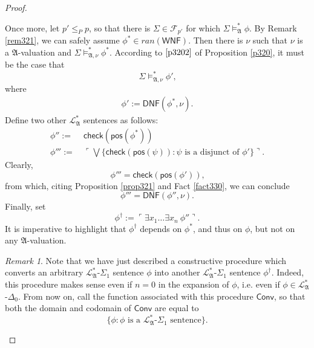 \documentclass[12pt, twoside]{memoir}
\numberwithin{equation}{section}
\theoremstyle{definition}
\theoremstyle{remark}
\newtheorem{rem}[thm]{Remark}
\theoremstyle{definition}
\theoremstyle{definition}
\theoremstyle{definition}
\theoremstyle{remark}
\begin{document}
\begin{proof}
\begin{enumerate}[label=Case \arabic*:, leftmargin=50pt]
    Once more, let $p' \leq_{P} p$, so that there is $\Sigma \in \mathcal{F}_{p'}$ for which $\Sigma \models^{*}_{\mathfrak{A}} \phi$. By Remark \ref{rem321}, we can safely assume $\phi^* \in ran(\mathsf{WNF})$. Then there is $\nu$ such that $\nu$ is a $\mathfrak{A}$-valuation and $\Sigma \models^{*}_{\mathfrak{A}, \nu} \phi^*$. According to $\ref{p3202}$ of Proposition \ref{p320}, it must be the case that
    \begin{equation}\label{eq32'}
        \Sigma \models^{*}_{\mathfrak{A}, \nu} \phi'\text{,}
    \end{equation}
    where
    \begin{align*}
        \phi' := \mathsf{DNF}(\phi^*, \nu) \text{.} 
    \end{align*}
    Define two other $\mathcal{L}^{*}_{\mathfrak{A}}$ sentences as follows: 
    \begin{align*}
        \phi'' := \ & \mathsf{check}(\mathsf{pos}(\phi^*)) \\
        \phi''' := \ & \ulcorner \bigvee \{\mathsf{check}(\mathsf{pos}(\psi)) : \psi \text{ is a disjunct of } \phi'\} \urcorner \text{.}
    \end{align*}
    Clearly,  
    \begin{equation*}
        \phi''' = \mathsf{check}(\mathsf{pos}(\phi')) \text{,}
    \end{equation*}
    from which, citing Proposition \ref{prop321} and Fact \ref{fact330}, we can conclude
    \begin{equation}\label{eq32f}
        \phi''' = \mathsf{DNF}(\phi'', \nu) \text{.}
    \end{equation}
    Finally, set
    \begin{equation*}
        \phi^{\dagger} := \ulcorner \exists x_1 \dots \exists x_n \ \phi'' \urcorner \text{.}
    \end{equation*}
    It is imperative to highlight that $\phi^{\dagger}$ depends on $\phi^*$, and thus on $\phi$, but not on any $\mathfrak{A}$-valuation.

    \begin{rem}\label{rem339}
    Note that we have just described a constructive procedure which converts an arbitrary $\mathcal{L}^{*}_{\mathfrak{A}}$-$\Sigma_1$ sentence $\phi$ into another $\mathcal{L}^{*}_{\mathfrak{A}}$-$\Sigma_1$ sentence $\phi^{\dagger}$. Indeed, this procedure makes sense even if $n = 0$ in the expansion of $\phi$, i.e. even if $\phi \in \mathcal{L}^{*}_{\mathfrak{A}}$-$\Delta_0$. From now on, call the function associated with this procedure $\mathsf{Conv}$, so that both the domain and codomain of $\mathsf{Conv}$ are equal to
    \begin{equation*}
        \{\phi: \phi \text{ is a } \mathcal{L}^{*}_{\mathfrak{A}}\text{-}\Sigma_1 \text{ sentence}\} \text{.}
    \end{equation*}
    \end{rem}


\end{enumerate}
\end{proof}
\end{document}

